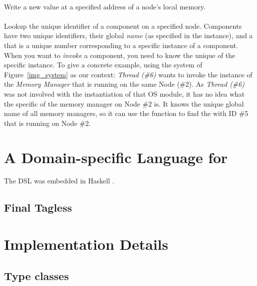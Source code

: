 \paragraph{}
Write a new value at a specified address of a node's local memory.
\paragraph{}
Lookup the unique identifier of a component on a specified node.
Components have two unique identifiers, their global \emph{name} (as
specified in the  instance), and a  that
is a unique number corresponding to a specific instance of a
component.  When you want to \emph{invoke} a component, you need to
know the unique  of the specific instance.  To give a
concrete example, using the system of Figure~\ref{img_system} as our
context: \emph{Thread (\#6)} wants to invoke the instance of the
\emph{Memory Manager} that is running on the same Node (\#2).  As
\emph{Thread (\#6)} was not involved with the instantiation of that OS
module, it has no idea what the specific  of the
memory manager on Node \#2 is.  It knows the unique global name of all
memory managers, so it can use the  function to
find the  with ID \#5 that is running on Node \#2.

\section{A Domain-specific Language for \soosim}
\label{sec:dsl}

The DSL was embedded in Haskell \cite{haskell-report}.

\subsection{Final Tagless}


\section{Implementation Details}
\label{sec:impl-detail}

\subsection{Type classes}

